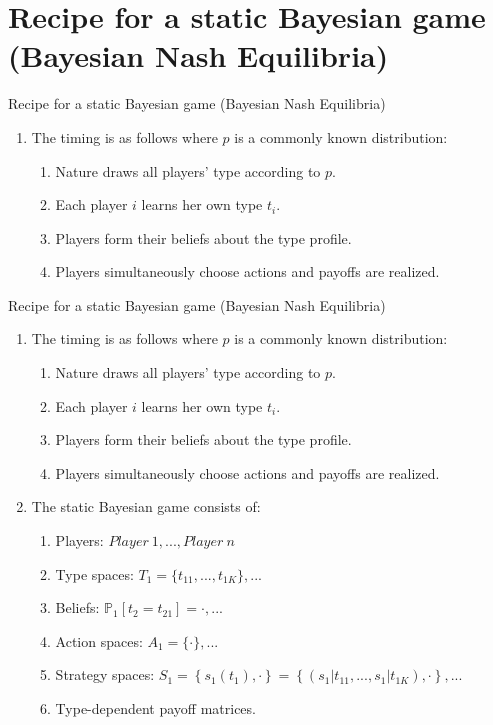 
\section{Recipe for a static Bayesian game (Bayesian Nash Equilibria)}

\begin{frame}{Recipe for a static Bayesian game (Bayesian Nash Equilibria)}
    \begin{enumerate}
      \item The timing is as follows where $p$ is a commonly known distribution:
      \begin{enumerate}\normalsize
        \item Nature draws all players' type according to $p$.
        \item Each player $i$ learns her own type $t_{i}$.
        \item Players form their beliefs about the type profile.
        \item Players simultaneously choose actions and payoffs are realized.
      \end{enumerate}
    \end{enumerate}
    \vfill\null
\end{frame}
\begin{frame}{Recipe for a static Bayesian game (Bayesian Nash Equilibria)}
    \begin{enumerate}
      \item The timing is as follows where $p$ is a commonly known distribution:
      \begin{enumerate}\normalsize
        \item Nature draws all players' type according to $p$.
        \item Each player $i$ learns her own type $t_{i}$.
        \item Players form their beliefs about the type profile.
        \item Players simultaneously choose actions and payoffs are realized.
      \end{enumerate}
      \item The static Bayesian game consists of:
      \begin{enumerate}\normalsize
        \item Players: $Player\ 1,...,Player\ n$
        \item Type spaces: $T_1=\{t_{11},...,t_{1K}\},...$
        \item Beliefs: $\mathbb{P}_1[t_2=t_{21}]=\cdot,...$
        \item Action spaces: $A_1=\{\cdot\},...$
        \item Strategy spaces: $S_1=\left\{s_1(t_1),\cdot\right\}=\left\{(s_1|t_{11},...,s_1|t_{1K}),\cdot\right\},...$
        \item Type-dependent payoff matrices.
      \end{enumerate}
    \end{enumerate}
    \vfill\null
\end{frame}
